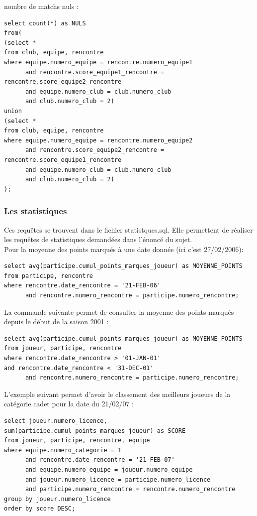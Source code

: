 \documentclass{article}
\begin{document}
nombre de matchs nuls : \\

\begin{verbatim}
select count(*) as NULS
from(
(select *
from club, equipe, rencontre
where equipe.numero_equipe = rencontre.numero_equipe1 
      and rencontre.score_equipe1_rencontre = rencontre.score_equipe2_rencontre
      and equipe.numero_club = club.numero_club
      and club.numero_club = 2)
union
(select *
from club, equipe, rencontre 
where equipe.numero_equipe = rencontre.numero_equipe2
      and rencontre.score_equipe2_rencontre = rencontre.score_equipe1_rencontre
      and equipe.numero_club = club.numero_club
      and club.numero_club = 2)
);
\end{verbatim}

\subsubsection{Les statistiques}
Ces requêtes se trouvent dans le fichier statistques.sql. Elle permettent de réaliser les requêtes de statistiques demandées dans l'énoncé du sujet. \\
Pour la moyenne des points marqués à une date donnée (ici c'est 27/02/2006): \\

\begin{verbatim}
select avg(participe.cumul_points_marques_joueur) as MOYENNE_POINTS
from participe, rencontre
where rencontre.date_rencontre = '21-FEB-06'
      and rencontre.numero_rencontre = participe.numero_rencontre;
\end{verbatim}

La commande suivante permet de consulter la moyenne des points marqués depuis le début de la saison 2001 : \\

\begin{verbatim}
select avg(participe.cumul_points_marques_joueur) as MOYENNE_POINTS
from joueur, participe, rencontre
where rencontre.date_rencontre > '01-JAN-01'
and rencontre.date_rencontre < '31-DEC-01'
      and rencontre.numero_rencontre = participe.numero_rencontre;
\end{verbatim}

L'exemple suivant permet d'avoir le classement des meilleurs joueurs de la catégorie cadet pour la date du 21/02/07 : \\

\begin{verbatim}
select joueur.numero_licence, sum(participe.cumul_points_marques_joueur) as SCORE
from joueur, participe, rencontre, equipe
where equipe.numero_categorie = 1
      and rencontre.date_rencontre = '21-FEB-07'
      and equipe.numero_equipe = joueur.numero_equipe
      and joueur.numero_licence = participe.numero_licence
      and participe.numero_rencontre = rencontre.numero_rencontre
group by joueur.numero_licence 
order by score DESC;
\end{verbatim}
\end{document}
